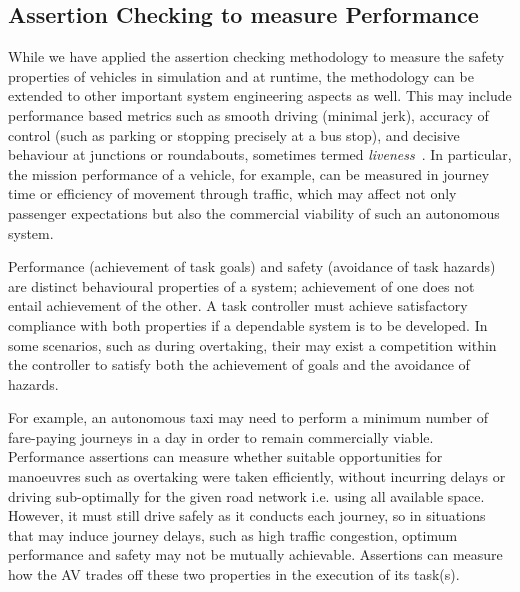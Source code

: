 \subsection{Assertion Checking to measure Performance}
While we have applied the assertion checking methodology to measure the safety properties of vehicles in simulation and at runtime, the methodology can be extended to other important system engineering aspects as well. This may include performance based metrics such as smooth driving (minimal jerk), accuracy of control (such as parking or stopping precisely at a bus stop), and decisive behaviour at junctions or roundabouts, sometimes termed \emph{liveness}~\cite{kim2014mpc}. In particular, the mission performance of a vehicle, for example, can be measured in journey time or efficiency of movement through traffic, which may affect not only passenger expectations but also the commercial viability of such an autonomous system. 

Performance (achievement of task goals) and safety (avoidance of task hazards) are distinct behavioural properties of a system; achievement of one does not entail achievement of the other. A task controller must achieve satisfactory compliance with both properties if a dependable system is to be developed. In some scenarios, such as during overtaking, their may exist a competition within the controller to satisfy both the achievement of goals and the avoidance of hazards. 

For example, an autonomous taxi may need to perform a minimum number of fare-paying journeys in a day in order to remain commercially viable. Performance assertions can measure whether suitable opportunities for manoeuvres such as overtaking were taken efficiently, without incurring delays or driving sub-optimally for the given road network i.e. using all available space. However, it must still drive safely as it conducts each journey, so in situations that may induce journey delays, such as high traffic congestion, optimum performance and safety may not be mutually achievable. Assertions can measure how the AV trades off these two properties in the execution of its task(s).

